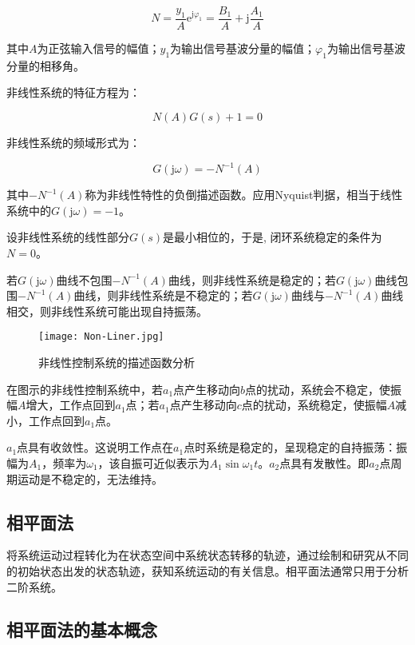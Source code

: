 \documentclass[cn, blue, normal, 12pt]{elegantnote}
\begin{document}
\begin{equation}
    N=\frac{y_1}{A}\mathrm{e}^{\mathrm{j}\varphi_1}=\frac{B_1}{A}+\mathrm{j}\frac{A_1}{A}
\end{equation}

其中$A$为正弦输入信号的幅值；$y_1$为输出信号基波分量的幅值；$\varphi_1$为输出信号基波分量的相移角。

非线性系统的特征方程为：

\begin{equation}
    N(A)G(s)+1=0
\end{equation}

非线性系统的频域形式为：

\begin{equation}
    G(\mathrm{j}\omega)=-N^{-1}(A)
\end{equation}

其中$-N^{-1}(A)$称为非线性特性的负倒描述函数。应用Nyquist判据，相当于线性系统中的$G(\mathrm{j}\omega)=-1$。

设非线性系统的线性部分$G(s)$是最小相位的，于是, 闭环系统稳定的条件为$N=0$。

若$G(\mathrm{j}\omega)$曲线不包围$-N^{-1}(A)$曲线，则非线性系统是稳定的；若$G(\mathrm{j}\omega)$曲线包围$-N^{-1}(A)$曲线，则非线性系统是不稳定的；若$G(\mathrm{j}\omega)$曲线与$-N^{-1}(A)$曲线相交，则非线性系统可能出现自持振荡。

\begin{figure}[htbp]
    \centering
    \texttt{[image: Non-Liner.jpg]}
    \caption{非线性控制系统的描述函数分析}
\end{figure}

在图示的非线性控制系统中，若$a_1$点产生移动向$b$点的扰动，系统会不稳定，使振幅$A$增大，工作点回到$a_1$点；若$a_1$点产生移动向$c$点的扰动，系统稳定，使振幅$A$减小，工作点回到$a_1$点。

$a_1$点具有收敛性。这说明工作点在$a_1$点时系统是稳定的，呈现稳定的自持振荡：振幅为$A_1$，频率为$\omega_1$，该自振可近似表示为$A_1\sin{\omega_1 t}$。$a_2$点具有发散性。即$a_2$点周期运动是不稳定的，无法维持。

\subsection{相平面法}

将系统运动过程转化为在状态空间中系统状态转移的轨迹，通过绘制和研究从不同的初始状态出发的状态轨迹，获知系统运动的有关信息。相平面法通常只用于分析二阶系统。

\subsection{相平面法的基本概念}
\end{document}
